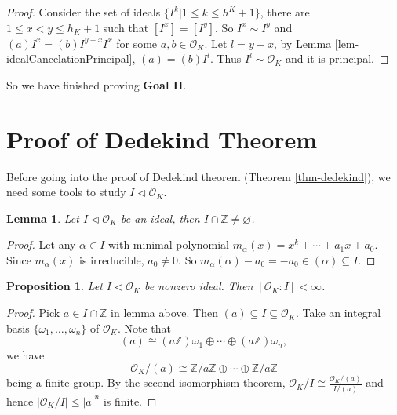 \documentclass[11pt]{book}
\newtheorem{lemma}[theorem]{Lemma}
\newtheorem{proposition}[theorem]{Proposition}
\begin{document}
\begin{proof}
    Consider the set of ideals $\{I^{k}|1\leq k\leq h^{K}+1\}$, there are $1\leq x<y\leq h_{K}+1$ such that $[I^{x}]=[I^{y}]$. So $I^{x}\sim I^{y}$ and $(a)I^{x}=(b)I^{y-x}I^{x}$ for some $a,b\in \mathcal{O}_{K}$. Let $l=y-x$, by Lemma \ref{lem-idealCancelationPrincipal}, $(a)=(b)I^{l}$. Thus $I^{l}\sim \mathcal{O}_{K}$ and it is principal. 
\end{proof}
So we have finished proving {\bf Goal II}.


\section{Proof of Dedekind Theorem}
Before going into the proof of Dedekind theorem (Theorem \ref{thm-dedekind}), we need some tools to study $I\lhd\mathcal{O}_{K}$. 

\begin{lemma}
    Let $I\lhd \mathcal{O}_{K}$ be an ideal, then $I\cap \mathbb{Z}\neq \varnothing$. 
\end{lemma}

\begin{proof}
    Let any $\alpha\in I$ with minimal polynomial $m_{\alpha}(x)=x^{k}+\cdots+a_{1}x+a_{0}$. Since $m_{\alpha}(x)$ is irreducible, $a_{0}\neq 0$. So $m_{\alpha}(\alpha)-a_{0}=-a_{0}\in (\alpha)\subseteq I$. 
\end{proof}

\begin{proposition}
    Let $I\lhd \mathcal{O}_{K}$ be nonzero ideal. Then $[\mathcal{O}_{K}:I]<\infty$. 
\end{proposition}

\begin{proof}
    Pick $a\in I\cap \mathbb{Z}$ in lemma above. Then $(a)\subseteq I\subseteq \mathcal{O}_{K}$. Take an integral basis $\{\omega_{1},\dots, \omega_{n}\}$ of $\mathcal{O}_{K}$. Note that
    \[
    (a)\cong (a\mathbb{Z})\omega_{1}\oplus\cdots\oplus (a\mathbb{Z})\omega_{n},
    \]
    we have 
    \[\mathcal{O}_{K}/(a)\cong \mathbb{Z} /a\mathbb{Z}\oplus \cdots\oplus \mathbb{Z} /a\mathbb{Z}\]
    being a finite group. By the second isomorphism theorem, $\mathcal{O}_{K} /I\cong \frac{\mathcal{O}_{K} /(a)}{I /(a)}$ and hence $\left| \mathcal{O}_{K} /I \right| \leq \left| a \right| ^{n}$ is finite.
\end{proof}
\end{document}
